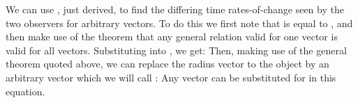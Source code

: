 {
We can use , just derived, to find the differing time
rates-of-change seen by the two observers for arbitrary vectors.
To do this we first note that  is equal to
, and then make use of the theorem that any general
relation valid for one vector is valid for all vectors.
%
%
Substituting  into , we get:
%
%
Then, making use of the general theorem quoted above, we can replace the
radius vector to the object by an arbitrary vector which we will call
:
%
%
Any vector can be substituted for  in this equation.
}%
%
